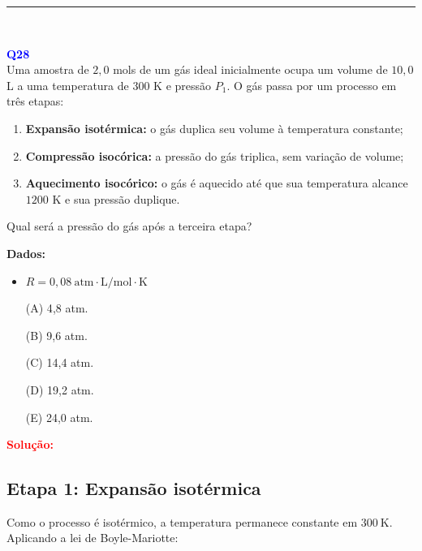 \documentclass[a4paper,12pt]{article}
\begin{document}
\noindent\rule{\linewidth}{0.6pt}\\

\begin{flushleft}
\textbf{\textcolor{blue}{\Large Q28}}\\

Uma amostra de $2{,}0$ mols de um gás ideal inicialmente ocupa um volume de $10{,}0$ L a uma temperatura de $300$ K e pressão $P_1$. 
O gás passa por um processo em três etapas:

\begin{enumerate}
    \item \textbf{Expansão isotérmica:} o gás duplica seu volume à temperatura constante;
    \item \textbf{Compressão isocórica:} a pressão do gás triplica, sem variação de volume;
    \item \textbf{Aquecimento isocórico:} o gás é aquecido até que sua temperatura alcance $1200$ K e sua pressão duplique.
\end{enumerate}

Qual será a pressão do gás após a terceira etapa?

\bigskip

\textbf{Dados:}

\begin{itemize}
    \item $R = 0{,}08 \ \text{atm} \cdot \text{L} / \text{mol} \cdot \text{K}$
\end{itemize}

\begin{itemize}
\item[(A)] 4{,}8 atm.
\item[(B)] 9{,}6 atm.  
\item[(C)] 14{,}4 atm.
\item[(D)] 19{,}2 atm.
\item[(E)] 24{,}0 atm.
\end{itemize}

\vspace{0.5cm}

\textcolor{red}{\textbf{Solução:}}\\

\subsection*{Etapa 1: Expansão isotérmica}

Como o processo é isotérmico, a temperatura permanece constante em $300 \ \text{K}$. Aplicando a lei de Boyle-Mariotte:


\end{flushleft}
\end{document}
